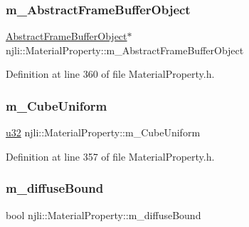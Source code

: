 \subsubsection{\texorpdfstring{m\+\_\+\+Abstract\+Frame\+Buffer\+Object}{m\_AbstractFrameBufferObject}}
{\footnotesize\ttfamily \mbox{\hyperlink{classnjli_1_1_abstract_frame_buffer_object}{Abstract\+Frame\+Buffer\+Object}}$\ast$ njli\+::\+Material\+Property\+::m\+\_\+\+Abstract\+Frame\+Buffer\+Object\hspace{0.3cm}{\ttfamily [private]}}



Definition at line 360 of file Material\+Property.\+h.

\mbox{\label{classnjli_1_1_material_property_a48374b6e4a3ec749e21499e76633606e}} 
\subsubsection{\texorpdfstring{m\+\_\+\+Cube\+Uniform}{m\_CubeUniform}}
{\footnotesize\ttfamily \mbox{\hyperlink{_util_8h_a10e94b422ef0c20dcdec20d31a1f5049}{u32}} njli\+::\+Material\+Property\+::m\+\_\+\+Cube\+Uniform\hspace{0.3cm}{\ttfamily [private]}}



Definition at line 357 of file Material\+Property.\+h.

\mbox{\label{classnjli_1_1_material_property_aeb9f7375f6cf29868549e99f1d709b3d}} 
\subsubsection{\texorpdfstring{m\+\_\+diffuse\+Bound}{m\_diffuseBound}}
{\footnotesize\ttfamily bool njli\+::\+Material\+Property\+::m\+\_\+diffuse\+Bound\hspace{0.3cm}{\ttfamily [private]}}



